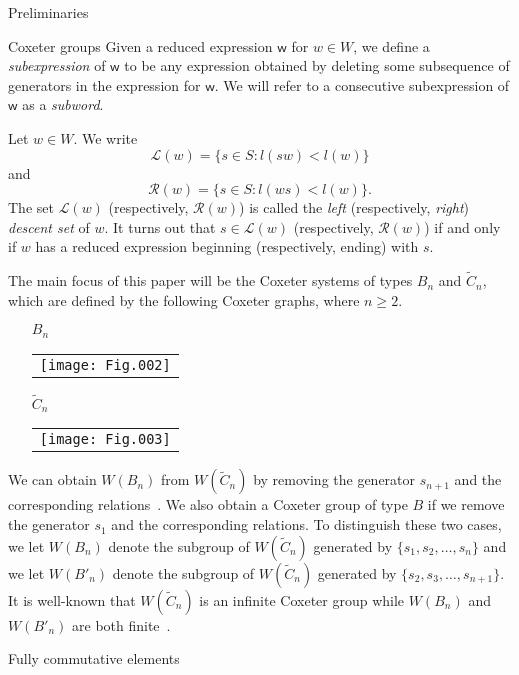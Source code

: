 \documentclass[12pt]{amsart}
\newcommand{\C}{\widetilde{C}}
\renewcommand{\L}{\mathcal{L}}
\newcommand{\R}{\mathcal{R}}
\renewcommand{\(}{\left(}
\renewcommand{\)}{\right)}
\newcommand{\w}{\mathsf{w}}
\begin{document}
\begin{section}{Preliminaries}
\begin{subsection}{Coxeter groups}
Given a reduced expression $\w$ for $w \in W$, we define a \emph{subexpression} of $\w$ to be any expression obtained by deleting some subsequence of generators in the expression for $\w$.  We will refer to a consecutive subexpression of $\w$ as a \emph{subword}.

Let $w \in W$.  We write
\[
\L(w)=\{s \in S: l(sw) < l(w)\}
\]
and
\[
\R(w)=\{s \in S: l(ws) < l(w)\}.
\]
The set $\L(w)$ (respectively, $\R(w)$) is called the \emph{left} (respectively, \emph{right}) \emph{descent set} of $w$.  It turns out that $s \in \L(w)$ (respectively, $\R(w)$) if and only if $w$ has a reduced expression beginning (respectively, ending) with $s$.

The main focus of this paper will be the Coxeter systems of types $B_n$ and $\C_n$, which are defined by the following Coxeter graphs, where $n\geq 2$.

\begin{itemize}

\item[$B_n$] \begin{tabular}{l}\texttt{[image: Fig.002]}\end{tabular}

\medskip

\item[$\C_n$] \begin{tabular}{l}\texttt{[image: Fig.003]}\end{tabular}

\end{itemize}

We can obtain $W(B_{n})$ from $W(\C_{n})$ by removing the generator $s_{n+1}$ and the corresponding relations~\cite[Chapter 5]{Humphreys.J:A}.  We also obtain a Coxeter group of type $B$ if we remove the generator $s_{1}$ and the corresponding relations.  To distinguish these two cases, we let $W(B_{n})$ denote the subgroup of $W(\C_{n})$ generated by $\{s_{1}, s_{2}, \dots, s_{n}\}$ and we let $W(B'_{n})$ denote the subgroup of $W(\C_{n})$ generated by $\{s_{2}, s_{3}, \dots, s_{n+1}\}$.  It is well-known that $W(\C_{n})$ is an infinite Coxeter group while $W(B_{n})$ and $W(B'_{n})$ are both finite~\cite[Chapters 2 and 6]{Humphreys.J:A}.

\end{subsection}


\begin{subsection}{Fully commutative elements}\label{subsec:FC}


\end{subsection}
\end{section}
\end{document}
